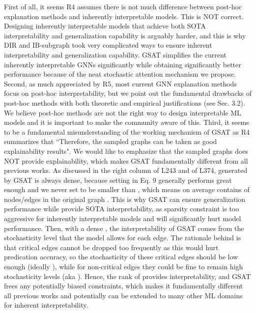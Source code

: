 \documentclass{article}
\begin{document}
First of all, it seems R4 assumes there is not much difference between post-hoc explanation methods and inherently interpretable models. This is NOT correct. Designing inherently interpretable models that achieve both SOTA interpretability and generalization capability is arguably harder, and this is why DIR and IB-subgraph took very complicated ways to ensure inherent interpretability and generalization capability. GSAT simplifies the current inherently interpretable GNNs significantly while obtaining significantly better performance because of the neat stochastic attention mechanism we propose. Second, as much appreciated by R5, most current GNN explanation methods focus on post-hoc interpretability, but we point out the fundamental drawbacks of post-hoc methods with both theoretic and empirical justifications (see Sec. 3.2). We believe post-hoc methods are not the right way to design interpretable ML models and it is important to make the community aware of this. Third, it seems to be a fundamental misunderstanding of the working mechanism of GSAT as R4 summarizes that ``Therefore, the sampled graphs can be taken as good explainability results". We would like to emphasize that the sampled graphs  does NOT provide explainability, which makes GSAT fundamentally different from all previous works. As discussed in the right column of L243 and of L374,  generated by GSAT is always dense, because setting  in Eq. 9 generally performs great enough and we never set  to be smaller than , which means  on average contains  of nodes/edges in the original graph . This is why GSAT can ensure generalization performance while provide SOTA interpretability, as sparsity constraint is too aggressive for inherently interpretable models and will significantly hurt model performance. Then, with a dense , the interpretability of GSAT comes from the stochasticity level that the model allows for each edge. The rationale behind is that critical edges cannot be dropped too frequently as this would hurt predication accuracy, so the stochasticity of these critical edges should be low enough (ideally ), while for non-critical edges they could be fine to remain high stochasticity levels (aka ). Hence, the rank of  provides interpretability, and GSAT frees any potentially biased constraints, which makes it fundamentally different all previous works and potentially can be extended to many other ML domains for inherent interpretability.
\end{document}
